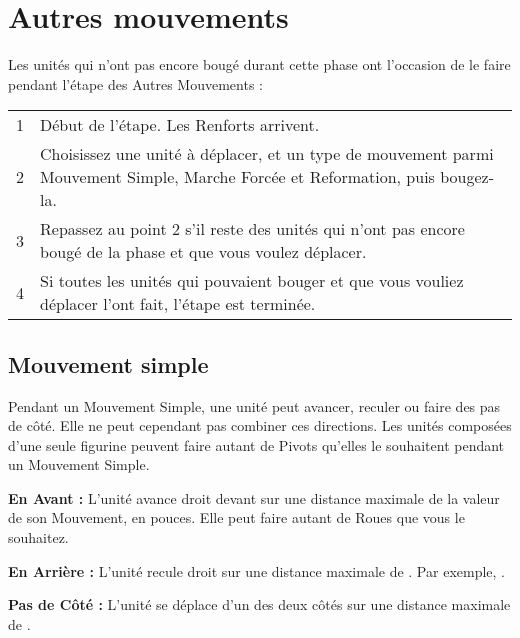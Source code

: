 \section{Autres mouvements}

Les unités qui n'ont pas encore bougé durant cette phase ont l'occasion de le faire pendant l'étape des Autres Mouvements :

\hspace*{0.3cm}
\begin{tabular}{c|m{12cm}}
1 & Début de l'étape. Les Renforts arrivent.\tabularnewline
2 & Choisissez une unité à déplacer, et un type de mouvement parmi Mouvement Simple, Marche Forcée et Reformation, puis bougez-la.\tabularnewline
3 & Repassez au point 2 s'il reste des unités qui n'ont pas encore bougé de la phase et que vous voulez déplacer.\tabularnewline
4 & Si toutes les unités qui pouvaient bouger et que vous vouliez déplacer l'ont fait, l'étape est terminée.\tabularnewline
\end{tabular}

\subsection{Mouvement simple}

Pendant un Mouvement Simple, une unité peut avancer, reculer ou faire des pas de côté. Elle ne peut cependant pas combiner ces directions. Les unités composées d'une seule figurine peuvent faire autant de Pivots qu'elles le souhaitent pendant un Mouvement Simple. 

\noindent\textbf{En Avant :} L'unité avance droit devant sur une distance maximale de la valeur de son Mouvement, en pouces. Elle peut faire autant de Roues que vous le souhaitez.

\noindent\textbf{En Arrière :} L'unité recule droit sur une distance maximale de . Par exemple, .

\noindent\textbf{Pas de Côté :} L'unité se déplace d'un des deux côtés sur une distance maximale de .

